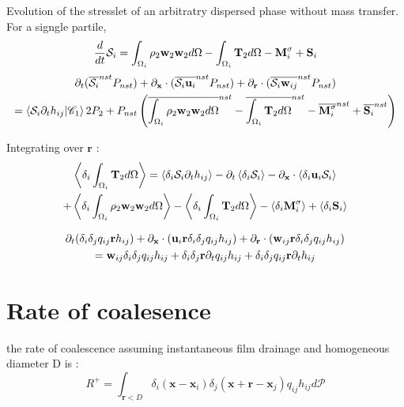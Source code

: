 Evolution of the stresslet of an arbitratry dispersed phase without mass transfer. 
For a signgle partile, 
\begin{equation}    
     \frac{d}{d t} \mathcal{S}_i
    =  \int_{\Omega_i} \rho_2 \textbf{w}_2 \textbf{w}_2d\Omega
    - \int_{\Omega_i}\mathbf{T}_2d\Omega
    -  \textbf{M}_i^\sigma
    +   \textbf{S}_i
\end{equation}
\begin{multline*}
    \partial_t (\overline{\mathcal{S}_{i}}^{nst} P_{nst}) 
    + \partial_\textbf{x} \cdot ( \overline{\mathcal{S}_{i}\textbf{u}_i}^{nst} P_{nst})
    + \partial_\textbf{r} \cdot ( \overline{\mathcal{S}_{i}\textbf{w}_{ij}}^{nst} P_{nst}) \\
    = 
    \left<\mathcal{S}_{i}\partial_t h_{ij} | \mathscr{C}_1\right>{2}P_2
    + P_{nst}\left(
        \overline{\int_{\Omega_i} \rho_2 \textbf{w}_2 \textbf{w}_2d\Omega}^{nst}
        - \overline{\int_{\Omega_i}\mathbf{T}_2d\Omega}^{nst}
        - \overline{\textbf{M}_i^\sigma}^{nst}
        + \overline{\textbf{S}_i}^{nst}
    \right)
\end{multline*}

Integrating over $\textbf{r}$ : 
\begin{multline*}
    \left<\delta_i \int_{\Omega_i}\mathbf{T}_2d\Omega\right>
    =
    \left<\delta_i\mathcal{S}_{i}\partial_t h_{ij}\right>
    - \partial_t \left<\delta_i \mathcal{S}_i\right>
    - \partial_\textbf{x} \cdot \left<\delta_i  \textbf{u}_i \mathcal{S}_i\right>\\
    + \left<\delta_i\int_{\Omega_i} \rho_2 \textbf{w}_2 \textbf{w}_2d\Omega\right>
    - \left<\delta_i\int_{\Omega_i}\mathbf{T}_2d\Omega\right>
    - \left<\delta_i\textbf{M}_i^\sigma\right>
    + \left<\delta_i\textbf{S}_i\right>
\end{multline*}

\begin{multline*}
    \partial_t (\delta_i\delta_{j}q_{ij}\textbf{r}h_{ij}) 
  + \partial_\textbf{x} \cdot (\textbf{u}_i \textbf{r}\delta_i\delta_{j}q_{ij}h_{ij})
  + \partial_\textbf{r} \cdot (\textbf{w}_{ij} \textbf{r}\delta_i\delta_{j}q_{ij}h_{ij}) \\
  =  \textbf{w}_{ij} \delta_i\delta_{j}q_{ij}h_{ij}
  + \delta_i\delta_{j}\textbf{r}\partial_t q_{ij}h_{ij} 
  + \delta_i\delta_{j}q_{ij}\textbf{r}\partial_t h_{ij} 
\end{multline*}

\section*{Rate of coalesence }

the rate of coalescence assuming instantaneous film drainage and homogeneous diameter D is :
\begin{equation*}
    R^+ 
    = \int_{\textbf{r}<D}\delta_i(\textbf{x} - \textbf{x}_i)\delta_{j}(\textbf{x} + \textbf{r} - \textbf{x}_j) q_{ij} h_{ij} d\mathscr{P}  
\end{equation*} 



